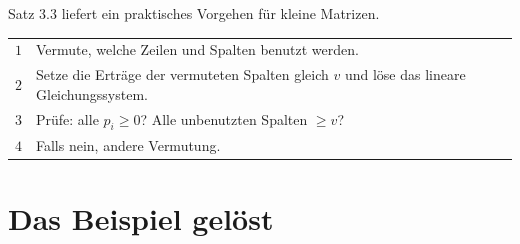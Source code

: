 \begin{merksatz}
Satz 3.3 liefert ein praktisches Vorgehen für kleine Matrizen.

\begin{center}
{\small
\renewcommand{\arraystretch}{1.5}
\begin{tabular}{@{}P{1.0cm}P{7.4cm}@{}}
\toprule
$1$ & Vermute, welche Zeilen und Spalten benutzt werden.\\
$2$ & Setze die Erträge der vermuteten Spalten gleich $v$ und löse das lineare Gleichungssystem.\\
$3$ & Prüfe: alle $p_i \ge 0$? Alle unbenutzten Spalten $\ge v$?\\
$4$ & Falls nein, andere Vermutung.\\
\bottomrule
\end{tabular}}
\end{center}

\begin{center}
\begin{minipage}{0.88\textwidth}
\end{minipage}
\end{center}
\end{merksatz}

\section{Das Beispiel gelöst}

